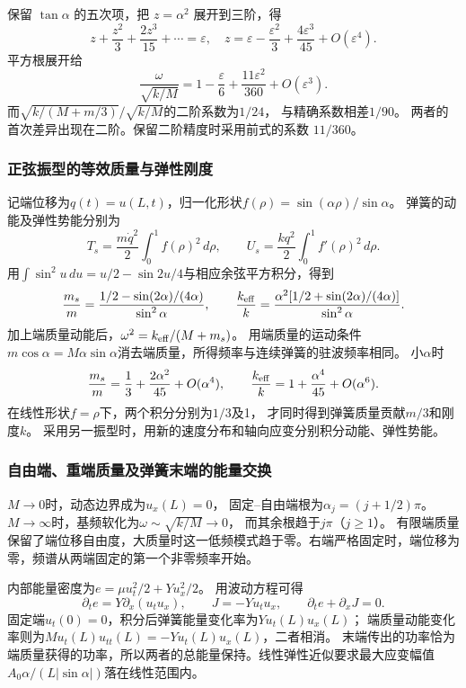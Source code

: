\documentclass[UTF8,fontset=fandol,a4paper,11pt]{ctexart}
\begin{document}
保留 $\tan\alpha$ 的五次项，把 $z=\alpha^2$ 展开到三阶，得
\[
z+\frac{z^2}{3}+\frac{2z^3}{15}+\cdots=\varepsilon,
\quad z=\varepsilon-\frac{\varepsilon^2}{3}
+\frac{4\varepsilon^3}{45}+O(\varepsilon^4).
\]
平方根展开给
\[
\frac\omega{\sqrt{k/M}}=1-\frac\varepsilon6
+\frac{11\varepsilon^2}{360}+O(\varepsilon^3).
\]
而$\sqrt{k/(M+m/3)}/\sqrt{k/M}$的二阶系数为$1/24$，
与精确系数相差$1/90$。
两者的首次差异出现在二阶。保留二阶精度时采用前式的系数 $11/360$。

\subsubsection*{正弦振型的等效质量与弹性刚度}
记端位移为$q(t)=u(L,t)$，归一化形状$f(\rho)=\sin(\alpha\rho)/\sin\alpha$。
弹簧的动能及弹性势能分别为
\[
T_s=\frac{m\dot q^2}{2}\int_0^1f(\rho)^2\,d\rho,
\qquad U_s=\frac{kq^2}{2}\int_0^1f'(\rho)^2\,d\rho.
\]
用$\int\sin^2u\,du=u/2-\sin2u/4$与相应余弦平方积分，得到
\[
\frac{m_s}{m}=\frac{1/2-\sin(2\alpha)/(4\alpha)}{\sin^2\alpha},\qquad
\frac{k_{\rm eff}}{k}=\frac{\alpha^2[1/2+\sin(2\alpha)/(4\alpha)]}{\sin^2\alpha}.
\]
加上端质量动能后，$\omega^2=k_{\rm eff}/(M+m_s)$。
用端质量的运动条件$m\cos\alpha=M\alpha\sin\alpha$消去端质量，所得频率与连续弹簧的驻波频率相同。
小$\alpha$时
\[
\frac{m_s}{m}=\frac13+\frac{2\alpha^2}{45}+O(\alpha^4),\qquad
\frac{k_{\rm eff}}k=1+\frac{\alpha^4}{45}+O(\alpha^6).
\]
在线性形状$f=\rho$下，两个积分分别为$1/3$及1，
才同时得到弹簧质量贡献$m/3$和刚度$k$。
采用另一振型时，用新的速度分布和轴向应变分别积分动能、弹性势能。

\subsubsection*{自由端、重端质量及弹簧末端的能量交换}
$M\to0$时，动态边界成为$u_x(L)=0$，
固定--自由端根为$\alpha_j=(j+1/2)\pi$。
$M\to\infty$时，基频软化为$\omega\sim\sqrt{k/M}\to0$，
而其余根趋于$j\pi$（$j\ge1$）。
有限端质量保留了端位移自由度，大质量时这一低频模式趋于零。右端严格固定时，端位移为零，频谱从两端固定的第一个非零频率开始。

内部能量密度为$e=\mu u_t^2/2+Yu_x^2/2$。
用波动方程可得
\[
\partial_t e=Y\partial_x(u_tu_x),\qquad
J=-Yu_tu_x,\qquad\partial_t e+\partial_xJ=0.
\]
固定端$u_t(0)=0$，积分后弹簧能量变化率为$Yu_t(L)u_x(L)$；
端质量动能变化率则为$Mu_t(L)u_{tt}(L)=-Yu_t(L)u_x(L)$，二者相消。
末端传出的功率恰为端质量获得的功率，所以两者的总能量保持。线性弹性近似要求最大应变幅值
$A_0\alpha/(L|\sin\alpha|)$落在线性范围内。


\end{document}
